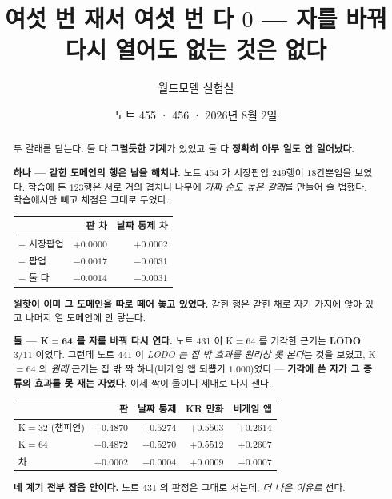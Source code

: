 \documentclass[11pt]{article}
\begin{document}
\title{여섯 번 재서 여섯 번 다 $0$ --- 자를 바꿔 다시 열어도 없는 것은
없다}
\author{월드모델 실험실}
\date{노트 455 · 456 · 2026년 8월 2일}
\maketitle

\begin{abstract}
두 갈래를 닫는다. 둘 다 \textbf{그럴듯한 기계}가 있었고 둘 다
\textbf{정확히 아무 일도 안 일어났다}.

\textbf{하나 --- 갇힌 도메인의 행은 남을 해치나.} 노트 454 가 시장팝업
$249$행이 $18$칸뿐임을 보였다. 학습에 든 $123$행은 서로 거의 겹치니
나무에 \emph{가짜 순도 높은 갈래}를 만들어 줄 법했다. 학습에서만 빼고
채점은 그대로 두었다.

\begin{center}
\begin{tabular}{lrr}
\hline
 & 판 차 & 날짜 통제 차 \\
\hline
$-$ 시장팝업 & $\mathbf{+0.0000}$ & $+0.0002$ \\
$-$ 팝업 & $-0.0017$ & $-0.0031$ \\
$-$ 둘 다 & $-0.0014$ & $-0.0031$ \\
\hline
\end{tabular}
\end{center}

\textbf{원핫이 이미 그 도메인을 따로 떼어 놓고 있었다.} 갇힌 행은 갇힌
채로 자기 가지에 앉아 있고 나머지 열 도메인에 안 닿는다.

\textbf{둘 --- K$=$64 를 자를 바꿔 다시 연다.} 노트 431 이 K$=$64 를
기각한 근거는 \textbf{LODO $3/11$} 이었다. 그런데 노트 441 이
\emph{LODO 는 집 밖 효과를 원리상 못 본다}는 것을 보였고, K$=$64 의
\emph{원래} 근거는 집 밖 짝 하나(비게임 앱 되뽑기 $1.000$)였다 ---
\textbf{기각에 쓴 자가 그 종류의 효과를 못 재는 자였다.} 이제 짝이 둘이니
제대로 다시 잰다.

\begin{center}
\begin{tabular}{lrrrr}
\hline
 & 판 & 날짜 통제 & KR 만화 & 비게임 앱 \\
\hline
K$=$32 (챔피언) & $+0.4870$ & $+0.5274$ & $+0.5503$ & $+0.2614$ \\
K$=$64 & $+0.4872$ & $+0.5270$ & $+0.5512$ & $+0.2607$ \\
\hline
차 & $+0.0002$ & $-0.0004$ & $+0.0009$ & $-0.0007$ \\
\hline
\end{tabular}
\end{center}

\textbf{네 계기 전부 잡음 안이다.} 노트 431 의 판정은 그대로 서는데,
\emph{더 나은 이유로} 선다.
\end{abstract}
\end{document}
